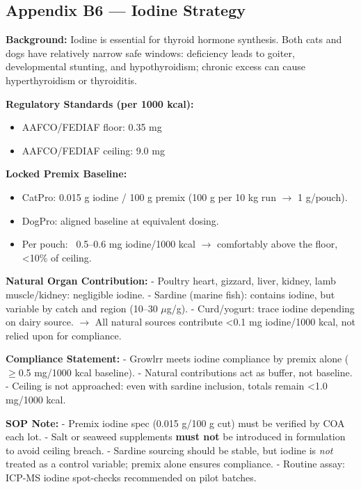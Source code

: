 \subsection*{Appendix B6 --- Iodine Strategy}

\textbf{Background:}  
Iodine is essential for thyroid hormone synthesis. Both cats and dogs have relatively narrow safe windows: deficiency leads to goiter, developmental stunting, and hypothyroidism; chronic excess can cause hyperthyroidism or thyroiditis.  

\textbf{Regulatory Standards (per 1000 kcal):}  
\begin{itemize}[leftmargin=1.2em]
  \item AAFCO/FEDIAF floor: 0.35 mg  
  \item AAFCO/FEDIAF ceiling: 9.0 mg  
\end{itemize}

\textbf{Locked Premix Baseline:}  
\begin{itemize}[leftmargin=1.2em]
  \item CatPro: 0.015 g iodine / 100 g premix (100 g per 10 kg run $\rightarrow$ 1 g/pouch).  
  \item DogPro: aligned baseline at equivalent dosing.  
  \item Per pouch: ~0.5--0.6 mg iodine/1000 kcal $\rightarrow$ comfortably above the floor, <10\% of ceiling.  
\end{itemize}

\textbf{Natural Organ Contribution:}  
- Poultry heart, gizzard, liver, kidney, lamb muscle/kidney: negligible iodine.  
- Sardine (marine fish): contains iodine, but variable by catch and region (10--30 $\mu$g/g).  
- Curd/yogurt: trace iodine depending on dairy source.  
$\rightarrow$ All natural sources contribute <0.1 mg iodine/1000 kcal, not relied upon for compliance.  

\textbf{Compliance Statement:}  
- Growlrr meets iodine compliance by premix alone ($\geq$0.5 mg/1000 kcal baseline).  
- Natural contributions act as buffer, not baseline.  
- Ceiling is not approached: even with sardine inclusion, totals remain <1.0 mg/1000 kcal.  

\textbf{SOP Note:}  
- Premix iodine spec (0.015 g/100 g cut) must be verified by COA each lot.  
- Salt or seaweed supplements \textbf{must not} be introduced in formulation to avoid ceiling breach.  
- Sardine sourcing should be stable, but iodine is \emph{not} treated as a control variable; premix alone ensures compliance.  
- Routine assay: ICP-MS iodine spot-checks recommended on pilot batches.  
